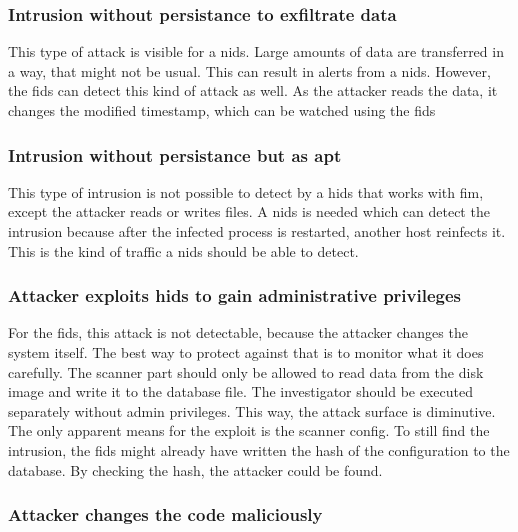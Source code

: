 \subsubsection{Intrusion without persistance to exfiltrate data}
\label{sec:defense:nopersistanceexfiltration}

This type of attack is visible for a \gls{nids}. Large amounts of data are transferred in a way, that might not be usual. This can result in alerts from a \gls{nids}. However, the \gls{fids} can detect this kind of attack as well. As the attacker reads the data, it changes the modified timestamp, which can be watched using the \gls{fids}

\subsubsection{Intrusion without persistance but as apt}
\label{sec:defense:nopersistanceapt}

This type of \gls{intrusion} is not possible to detect by a \gls{hids} that works with \gls{fim}, except the attacker reads or writes files. A \gls{nids} is needed which can detect the \gls{intrusion} because after the infected process is restarted, another host reinfects it. This is the kind of traffic a \gls{nids} should be able to detect.

\subsubsection{Attacker exploits \gls{hids} to gain administrative privileges}
\label{sec:defense:exploitforroot}

For the \gls{fids}, this attack is not detectable, because the attacker changes the system itself. The best way to protect against that is to monitor what it does carefully. The scanner part should only be allowed to read data from the disk image and write it to the database file. The investigator should be executed separately without admin privileges. This way, the attack surface is diminutive. The only apparent means for the exploit is the scanner config. To still find the \gls{intrusion}, the \gls{fids} might already have written the hash of the configuration to the database. By checking the hash, the attacker could be found. 

\subsubsection{Attacker changes the code maliciously}
\label{sec:defense:codechange}

